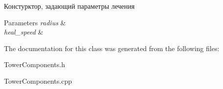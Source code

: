 Констурктор, задающий параметры лечения 


\begin{DoxyParams}{Parameters}
{\em radius} & \\
\hline
{\em heal\+\_\+speed} & \\
\hline
\end{DoxyParams}


The documentation for this class was generated from the following files\+:\begin{DoxyCompactItemize}
\item 
Tower\+Components.\+h\item 
Tower\+Components.\+cpp\end{DoxyCompactItemize}
